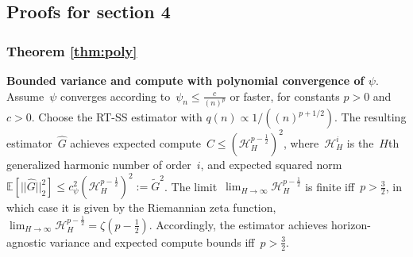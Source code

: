 \subsection{Proofs for section 4}

\subsubsection{Theorem \ref{thm:poly}}
\textbf{Bounded variance and compute with polynomial convergence of $\psi$}.
Assume~$\psi$ converges according to~$\psi_n \leq \frac{c}{(n)^p}$ or faster, for constants ${p > 0}$ and~$c > 0$.
Choose the RT-SS estimator with ${q(n) \propto 1/((n)^{p + 1/2})}$.
The resulting estimator~$\hat{G}$ achieves expected compute~${C \leq (\mathcal{H}_{H}^{p-\frac{1}{2}})^2}$, where~$\mathcal{H}_H^i$ is the~$H$th generalized harmonic number of order~$i$, and expected squared norm~${\mathbb{E}[ ||\hat{G}||_2^2 ] \leq c_{\psi}^2 (\mathcal{H}_H^{p-\frac{1}{2}})^2 := \tilde{G}^2}$.
The limit~${\lim_{H \to \infty} \mathcal{H}_H^{p - \frac{1}{2}}}$ is finite iff~${p > \frac{3}{2}}$, in which case it is given by the Riemannian zeta function,~${\lim_{H \to \infty} \mathcal{H}_H^{p - \frac{1}{2}} = \zeta(p - \frac{1}{2})}$.
Accordingly, the estimator achieves horizon-agnostic variance and expected compute bounds iff~${p > \frac{3}{2}}$.
